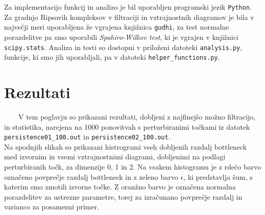 \documentclass[a4paper,11pt]{article}
\theoremstyle{definition}
\theoremstyle{plain}
\begin{document}
Za implementacijo funkcij in analizo je bil uporabljen programski jezik \texttt{Python}.
Za gradnjo Ripsovih kompleksov v filtraciji in vztrajnostnih diagramov je bila v največji meri uporabljena že vgrajena knjižnica \texttt{gudhi}, 
za test normalne porazdelitve pa smo uporabili \textit{Spahiro-Wilkov test}, ki je vgrajen v knjižnici \texttt{scipy.stats}.
Analiza in testi so dostopni v priloženi datoteki \texttt{analysis.py}, funkcije, ki smo jih uporabljali, pa v datoteki \texttt{helper\_functions.py}.


\section{Rezultati}

\ \ \ \ 
V tem poglavju so prikazani rezultati, dobljeni z najfinejšo možno filtracijo, in statistika, 
narejena na 1000 ponovitvah s perturbiranimi točkami iz datotek \texttt{persistence01\_100.out} in \texttt{persistence02\_100.out}.
\\

Na spodnjih slikah so prikazani histrogrami vseh dobljenih razdalj bottleneck med izvornim in vsemi vztrajnostnimi diagrami, dobljenimi na podlagi perturbiranih točk, za dimenzije 0, 1 in 2.
Na vsakem histogramu je z rdečo barvo označeno povprečje razdalj bottleneck in z zeleno barvo $\epsilon$, ki predstavlja šum, s katerim smo zmotili izvorne točke.
Z oranžno barvo je označena normalna porazdelitev za ustrezne parametre, torej za izračunano povprečje razdalj in varianco za posamezni primer.
\\
\end{document}
